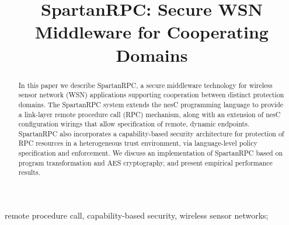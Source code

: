 \title{SpartanRPC: Secure WSN Middleware for Cooperating Domains}
\author{
\and
{}
}
\maketitle

\begin{abstract}
  In this paper we describe SpartanRPC, a secure middleware technology
  for wireless sensor network (WSN) applications supporting
  cooperation between distinct protection domains. The SpartanRPC
  system extends the nesC programming language to provide a link-layer
  remote procedure call (RPC) mechanism, along with an extension of
  nesC configuration wirings that allow specification of remote,
  dynamic endpoints. SpartanRPC also incorporates a capability-based
  security architecture for protection of RPC resources in a
  heterogeneous trust environment, via language-level policy
  specification and enforcement. We discuss an implementation of
  SpartanRPC based on program transformation and AES cryptography, and
  present empirical performance results.
\end{abstract}

\begin{IEEEkeywords}
remote procedure call, capability-based security, wireless sensor networks;
\end{IEEEkeywords}
